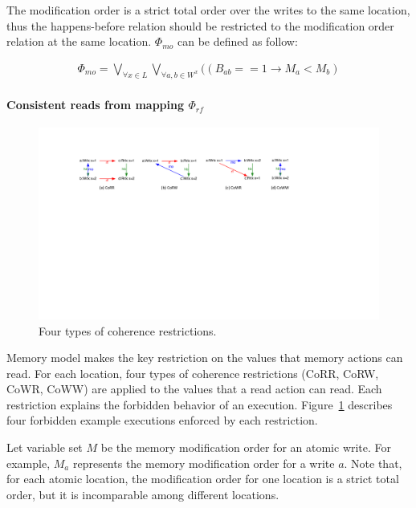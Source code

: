 \documentclass[preprint, numbers, 10pt]{sigplanconf}
\begin{document}
The modification order is a strict total order over the writes to the same location, thus 
the happens-before relation should be restricted to the modification order relation 
at the same location. $\Phi_{mo}$ can be defined as follow: 

\begin{equation}
\begin{aligned}
\Phi_{mo} = \bigvee_{\forall x\in L }\bigvee_{\forall a,b\in W^x} ((B_{ab}==1\rightarrow M_a<M_b) 
\end{aligned}
\end{equation} 


\paragraph{Consistent reads from mapping $\Phi_{rf}$}

\begin{figure}%
\centering\includegraphics[scale=0.65]{CO.pdf} %
\caption{Four types of coherence restrictions.}
\label{fig:CO}
\end{figure}

Memory model makes the key restriction on the values that memory actions can read. 
For each location, four types of coherence restrictions 
(CoRR, CoRW, CoWR, CoWW) are applied to the 
values that a read action can read. Each restriction explains the forbidden behavior of 
an execution. Figure~\ref{fig:CO} describes four forbidden example executions enforced
by each restriction. 

Let variable set $M$ be the memory modification order for an atomic write. For example, 
$M_{a}$ represents the memory modification order for a write $a$. 
Note that, for each atomic location, the modification order for one location is a strict total order, but 
it is incomparable among different locations. 
\end{document}
